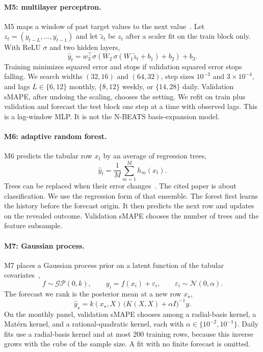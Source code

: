 \paragraph{M5: multilayer perceptron.}
M5 maps a window of past target values to the next value~\citep{goodfellow2016dl}.
Let $z_t = (y_{t-L},\ldots,y_{t-1})$ and let $\tilde z_t$ be $z_t$ after a scaler fit on the train block only.
With ReLU $\sigma$ and two hidden layers,
\begin{equation}
  \hat y_t
  = w_3^{\top}\sigma\!\left(W_2\,\sigma(W_1\tilde z_t + b_1) + b_2\right) + b_3.
  \label{eq:mlp}
\end{equation}
Training minimizes squared error and stops if validation squared error stops falling.
We search widths $(32,16)$ and $(64,32)$, step sizes $10^{-3}$ and $3\times 10^{-4}$, and lags $L \in \{6,12\}$ monthly, $\{8,12\}$ weekly, or $\{14,28\}$ daily.
Validation sMAPE, after undoing the scaling, chooses the setting.
We refit on train plus validation and forecast the test block one step at a time with observed lags.
This is a lag-window MLP.
It is not the N-BEATS basis-expansion model.

\paragraph{M6: adaptive random forest.}
M6 predicts the tabular row $x_t$ by an average of regression trees,
\begin{equation}
  \hat y_t = \frac{1}{M}\sum_{m=1}^{M} h_m(x_t).
  \label{eq:arf}
\end{equation}
Trees can be replaced when their error changes~\citep{gomes2017arf}.
The cited paper is about classification.
We use the regression form of that ensemble.
The forest first learns the history before the forecast origin.
It then predicts the next row and updates on the revealed outcome.
Validation sMAPE chooses the number of trees and the feature subsample.

\paragraph{M7: Gaussian process.}
M7 places a Gaussian process prior on a latent function of the tabular covariates~\citep{rasmussen2006gp},
\begin{equation}
  f \sim \mathcal{GP}(0, k),
  \qquad
  y_i = f(x_i) + \varepsilon_i,
  \qquad
  \varepsilon_i \sim \mathcal{N}(0, \alpha).
  \label{eq:gp}
\end{equation}
The forecast we rank is the posterior mean at a new row $x_{\star}$,
\begin{equation}
  \hat y_{\star}
  = k(x_{\star}, X)\,
    \bigl(K(X,X) + \alpha I\bigr)^{-1} y.
  \label{eq:gp-mean}
\end{equation}
On the monthly panel, validation sMAPE chooses among a radial-basis kernel, a Mat\'ern kernel, and a rational-quadratic kernel, each with $\alpha \in \{10^{-2}, 10^{-1}\}$.
Daily fits use a radial-basis kernel and at most 200 training rows, because this inverse grows with the cube of the sample size.
A fit with no finite forecast is omitted.

